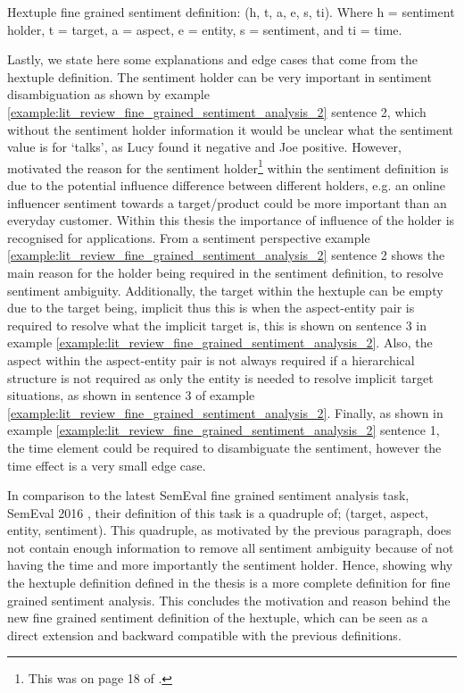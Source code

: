 \begin{definition}
Hextuple fine grained sentiment definition: (h, t, a, e, s, ti). Where h = sentiment holder, t = target, a = aspect, e = entity, s = sentiment, and ti = time.
\label{definition:lit_review_fine_grained_sentiment_analysis_hextuple}
\end{definition}

Lastly, we state here some explanations and edge cases that come from the hextuple definition. The sentiment holder can be very important in sentiment disambiguation as shown by example \ref{example:lit_review_fine_grained_sentiment_analysis_2} sentence 2, which without the sentiment holder information it would be unclear what the sentiment value is for `talks', as Lucy found it negative and Joe positive. However, \citet{liu2015sentiment} motivated the reason for the sentiment holder\footnote{This was on page 18 of \citet{liu2015sentiment}.} within the sentiment definition is due to the potential influence difference between different holders, e.g. an online influencer sentiment towards a target/product could be more important than an everyday customer. Within this thesis the importance of influence of the holder is recognised for applications. From a sentiment perspective example \ref{example:lit_review_fine_grained_sentiment_analysis_2} sentence 2 shows the main reason for the holder being required in the sentiment definition, to resolve sentiment ambiguity. Additionally, the target within the hextuple can be empty due to the target being, implicit thus this is when the aspect-entity pair is required to resolve what the implicit target is, this is shown on sentence 3 in example \ref{example:lit_review_fine_grained_sentiment_analysis_2}. Also, the aspect within the aspect-entity pair is not always required if a hierarchical structure is not required as only the entity is needed to resolve implicit target situations, as shown in sentence 3 of example \ref{example:lit_review_fine_grained_sentiment_analysis_2}. Finally, as shown in example \ref{example:lit_review_fine_grained_sentiment_analysis_2} sentence 1, the time element could be required to disambiguate the sentiment, however the time effect is a very small edge case. 

In comparison to the latest SemEval fine grained sentiment analysis task, SemEval 2016 \citep{pontiki-etal-2016-semeval}, their definition of this task is a quadruple of; (target, aspect, entity, sentiment). This quadruple, as motivated by the previous paragraph, does not contain enough information to remove all sentiment ambiguity because of not having the time and more importantly the sentiment holder. Hence, showing why the hextuple definition defined in the thesis is a more complete definition for fine grained sentiment analysis. This concludes the motivation and reason behind the new fine grained sentiment definition of the hextuple, which can be seen as a direct extension and backward compatible with the previous definitions.

